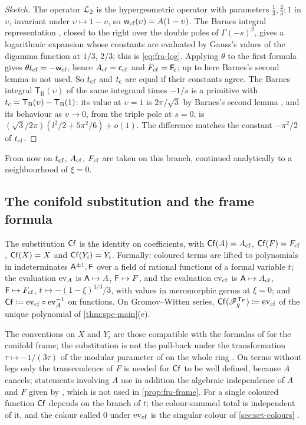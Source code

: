 \begin{proof}[Sketch]
The operator $\mathcal{L}_{2}$ is the hypergeometric operator with parameters $\tfrac13,\tfrac23;1$ in $\upsilon$, invariant under $\upsilon\mapsto1-\upsilon$, so $\mathsf{w}_{\mathrm{cf}}(\upsilon)=A(1-\upsilon)$. The Barnes integral representation \cite[Eq.~15.6.7]{DLMF}, closed to the right over the double poles of $\Gamma(-s)^2$, gives a logarithmic expansion whose constants are evaluated by Gauss's values of the digamma function at $1/3$, $2/3$; this is \eqref{eq:fra-log}. Applying $\theta$ to the first formula gives $\theta t_{\mathrm{cf}}=-\mathsf{w}_{\mathrm{cf}}$, hence $A_{\mathrm{cf}}=\mathsf{c}_{\mathrm{cf}}$ and $F_{\mathrm{cf}}=\mathsf{F}_{\!\mathsf{c}}$; up to here Barnes's second lemma is not used. So $t_{\mathrm{cf}}$ and $t_{\mathrm{c}}$ are equal if their constants agree. The Barnes integral $\mathsf{T}_{\mathrm{B}}(\upsilon)$ of the same integrand times $-1/s$ is a primitive with $t_{\mathrm{c}}=\mathsf{T}_{\mathrm{B}}(\upsilon)-\mathsf{T}_{\mathrm{B}}(1)$: its value at $\upsilon=1$ is $2\pi/\sqrt3$ by Barnes's second lemma \cite{Bar10}, and its behaviour as $\upsilon\to0$, from the triple pole at $s=0$, is $(\sqrt3/2\pi)(l^2/2+5\pi^2/6)+o(1)$. The difference matches the constant $-\pi^2/2$ of $t_{\mathrm{cf}}$.
\end{proof}

From now on $t_{\mathrm{cf}}$, $A_{\mathrm{cf}}$, $F_{\mathrm{cf}}$ are taken on this branch, continued analytically to a neighbourhood of $\xi=0$.

\subsection{The conifold substitution and the frame formula}

\begin{defn}
\label{def:fra-cf}
The substitution $\mathsf{Cf}$ is the identity on coefficients, with $\mathsf{Cf}(A)=A_{\mathrm{cf}}$, $\mathsf{Cf}(F)=F_{\mathrm{cf}}$, $\mathsf{Cf}(X)=X$ and $\mathsf{Cf}(Y_i)=Y_i$. Formally: coloured terms are lifted to polynomials in indeterminates $\mathsf{A}^{\pm1},\mathsf{F}$ over a field of rational functions of a formal variable $t$; the evaluation $\mathrm{ev}_{A}$ is $\mathsf{A}\mapsto A$, $\mathsf{F}\mapsto F$, and the evaluation $\mathrm{ev}_{\mathrm{cf}}$ is $\mathsf{A}\mapsto A_{\mathrm{cf}}$, $\mathsf{F}\mapsto F_{\mathrm{cf}}$, $t\mapsto-(1-\xi)^{1/3}/3$, with values in meromorphic germs at $\xi=0$; and $\mathsf{Cf}\coloneqq\mathrm{ev}_{\mathrm{cf}}\circ\mathrm{ev}_{A}^{-1}$ on functions. On Gromov--Witten series, $\mathsf{Cf}(\mathscr{F}_g^{\mathsf{T}_{\mathrm{F}}})\coloneqq\mathrm{ev}_{\mathrm{cf}}$ of the unique polynomial of \cref{thm:spe-main}\textup{(e)}.
\end{defn}

The conventions on $X$ and $Y_i$ are those compatible with the formulas of \cite{BS} for the conifold frame; the substitution is not the pull-back under the transformation $\tau\mapsto-1/(3\tau)$ of the modular parameter of \cite{BS} on the whole ring . On terms without legs only the transcendence of $F$ is needed for $\mathsf{Cf}$ to be well defined, because $A$ cancels; statements involving $A$ use in addition the algebraic independence of $A$ and $F$ given by \cite[Lemma~4.2]{BFGW21}, which is not used in \cref{prop:fra-frame}. For a single coloured function $\mathsf{Cf}$ depends on the branch of $t$; the colour-summed total is independent of it, and the colour called $0$ under $\mathrm{ev}_{\mathrm{cf}}$ is the singular colour of \cref{sec:set-colours} .


